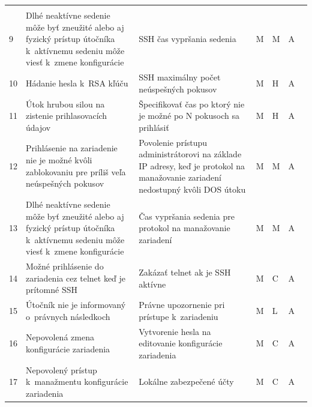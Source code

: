 \begin{longtable}[!htbp]{|C{2.5em}L{11em}L{11em}C{2.5em}C{4em}C{5em}L{2.5em}|}
	\cite{Barker2019} 
	\\
	 9	&Dlhé neaktívne sedenie môže byť zneužité alebo aj fyzický prístup útočníka k~aktívnemu sedeniu môže viesť k~zmene konfigurácie	&SSH čas vypršania sedenia	&M	&M	&A	& \cite{CIS_DrTLsgXv24lxeIIM}
	
	\cite{Graesser2001}	\\
	10	&Hádanie hesla k~RSA kľúču	&SSH maximálny počet neúspešných pokusov	&M	&H	&A	& \cite{Hucaby2010}
	
	\cite{Bouska2009}	\\
	 11	&Útok hrubou silou na zistenie prihlasovacích údajov	&Špecifikovať čas po ktorý nie je možné po N pokusoch sa prihlásiť	&M	&H	&A	& \cite{Hucaby2010}
	
	\cite{Bouska2009}	\\
	12	&Prihlásenie na zariadenie nie je možné kvôli zablokovaniu pre príliš veľa neúspešných pokusov	&Povolenie prístupu administrátorovi na základe IP adresy, keď je protokol na manažovanie zariadení nedostupný kvôli DOS útoku	&M	&M	&A	& \cite{Hucaby2010}
	
	\cite{Bouska2009}	\\
	 13	&Dlhé neaktívne sedenie môže byť zneužité alebo aj fyzický prístup útočníka k~aktívnemu sedeniu môže viesť k~zmene konfigurácie	&Čas vypršania sedenia pre protokol na manažovanie zariadení	&M	&M	&A	& \cite{CIS_DrTLsgXv24lxeIIM}
	
	\cite{Graesser2001}
	
	\cite{uYLsMtQInofenpV3}
	\\
	14	&Možné prihlásenie do zariadenia cez telnet keď je prítomné SSH	&Zakázať telnet ak je SSH aktívne	&M	&C	&A	& \cite{CIS_DrTLsgXv24lxeIIM}
	
	\cite{Graesser2001}	\\
	 15	&Útočník nie je informovaný o~právnych následkoch	&Právne upozornenie pri prístupe k~zariadeniu	&M	&L	&A	& \cite{McMillan2018}
	
	\cite{CIS_DrTLsgXv24lxeIIM}
	
	\cite{Graesser2001}	\\
	16	&Nepovolená zmena konfigurácie zariadenia	&Vytvorenie hesla na editovanie konfigurácie zariadenia	&M	&C	&A	& \cite{CIS_DrTLsgXv24lxeIIM}
	
	\cite{Graesser2001}	\\
	 17	&Nepovolený prístup k~manažmentu konfigurácie zariadenia	&Lokálne zabezpečené účty	&M	&C	&A	& \cite{Singh2018}
	

\end{longtable}
